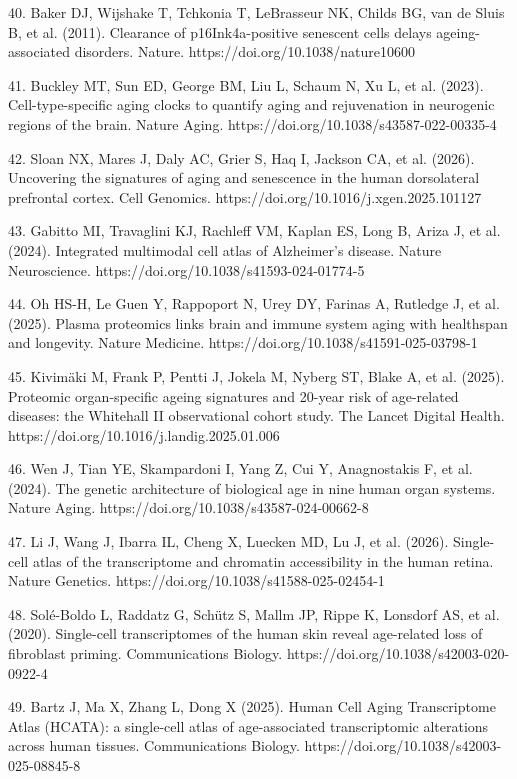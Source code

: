 \documentclass[11pt]{article}
\begin{document}
40. Baker DJ, Wijshake T, Tchkonia T, LeBrasseur NK, Childs BG, van de Sluis B, et al. (2011). Clearance of p16Ink4a-positive senescent cells delays ageing-associated disorders. Nature. https://doi.org/10.1038/nature10600

41. Buckley MT, Sun ED, George BM, Liu L, Schaum N, Xu L, et al. (2023). Cell-type-specific aging clocks to quantify aging and rejuvenation in neurogenic regions of the brain. Nature Aging. https://doi.org/10.1038/s43587-022-00335-4

42. Sloan NX, Mares J, Daly AC, Grier S, Haq I, Jackson CA, et al. (2026). Uncovering the signatures of aging and senescence in the human dorsolateral prefrontal cortex. Cell Genomics. https://doi.org/10.1016/j.xgen.2025.101127

43. Gabitto MI, Travaglini KJ, Rachleff VM, Kaplan ES, Long B, Ariza J, et al. (2024). Integrated multimodal cell atlas of Alzheimer's disease. Nature Neuroscience. https://doi.org/10.1038/s41593-024-01774-5

44. Oh HS-H, Le Guen Y, Rappoport N, Urey DY, Farinas A, Rutledge J, et al. (2025). Plasma proteomics links brain and immune system aging with healthspan and longevity. Nature Medicine. https://doi.org/10.1038/s41591-025-03798-1

45. Kivim\"aki M, Frank P, Pentti J, Jokela M, Nyberg ST, Blake A, et al. (2025). Proteomic organ-specific ageing signatures and 20-year risk of age-related diseases: the Whitehall II observational cohort study. The Lancet Digital Health. https://doi.org/10.1016/j.landig.2025.01.006

46. Wen J, Tian YE, Skampardoni I, Yang Z, Cui Y, Anagnostakis F, et al. (2024). The genetic architecture of biological age in nine human organ systems. Nature Aging. https://doi.org/10.1038/s43587-024-00662-8

47. Li J, Wang J, Ibarra IL, Cheng X, Luecken MD, Lu J, et al. (2026). Single-cell atlas of the transcriptome and chromatin accessibility in the human retina. Nature Genetics. https://doi.org/10.1038/s41588-025-02454-1

48. Sol\'e-Boldo L, Raddatz G, Sch\"utz S, Mallm JP, Rippe K, Lonsdorf AS, et al. (2020). Single-cell transcriptomes of the human skin reveal age-related loss of fibroblast priming. Communications Biology. https://doi.org/10.1038/s42003-020-0922-4

49. Bartz J, Ma X, Zhang L, Dong X (2025). Human Cell Aging Transcriptome Atlas (HCATA): a single-cell atlas of age-associated transcriptomic alterations across human tissues. Communications Biology. https://doi.org/10.1038/s42003-025-08845-8
\end{document}
